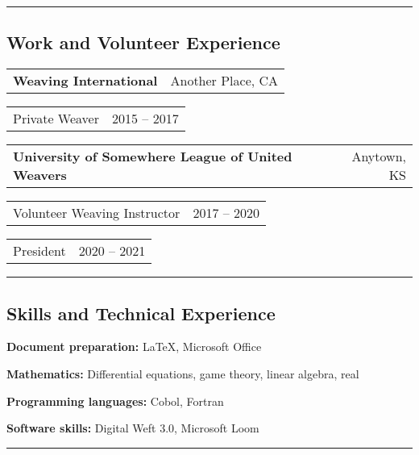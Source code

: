 \documentclass[10pt,letterpaper]{article}
\makeatletter
\newlength{\step}
\newlength{\twostep}
\newlength{\aligngroupinlen}
\newcommand{\aligngroup}[2]
{\begin{tabular*}{\linewidth}{@{}l@{\extracolsep{\fill}}r@{}}
		#1 &
		#2 \\
\end{tabular*}}
\newcommand{\aligngroupin}[2]
{\setlength{\aligngroupinlen}{\linewidth}\addtolength{\aligngroupinlen}{-\step}\hspace*{\step}\begin{tabular*}{\aligngroupinlen}{@{}l@{\extracolsep{\fill}}r@{}}
		#1 &
		#2 \\
\end{tabular*}}
\newenvironment{indentsection}%
	{\begin{list}%
			{}%
			{\setlength{\leftmargin}{\step}%
			 \setlength{\parsep}{\parskip}%
			 \setlength{\itemsep}{0pt}%
			}%
			\item[]%
	}%
	{\end{list}}%
\newenvironment{hangingpar}%
	{\begin{list}%
			{}%
			{\setlength{\itemindent}{-\step}%
			 \setlength{\leftmargin}{\twostep}%
			 \setlength{\itemsep}{0pt}%
			 \setlength{\parsep}{\parskip}%
			 }%
			\setlength{\parindent}{-\step}%
			\item[]%
	}%
	{\end{list}
	 \vspace{0.25em}}%
\makeatother
\begin{document}
\begin{hangingpar}


	
\end{hangingpar}
\hrule
\subsection*{Work and Volunteer Experience}
\begin{indentsection}
	\aligngroup
		{\textbf{Weaving International}}
		{Another Place, CA}
	\aligngroupin
		{Private Weaver}
		{2015 -- 2017}
	\aligngroup
		{\textbf{University of Somewhere League of United Weavers}}
		{Anytown, KS}
	\aligngroupin
		{Volunteer Weaving Instructor}
		{2017 -- 2020}
	\aligngroupin
		{President}
		{2020 -- 2021}
\end{indentsection}
\hrule
\subsection*{Skills and Technical Experience}
\begin{hangingpar}
	\textbf{Document preparation:} \LaTeX{}, Microsoft Office

	\textbf{Mathematics:} Differential equations, game theory, linear algebra, real

	\textbf{Programming languages:} Cobol, Fortran

	\textbf{Software skills:} Digital Weft 3.0, Microsoft Loom
\end{hangingpar}
\hrule
\end{document}
